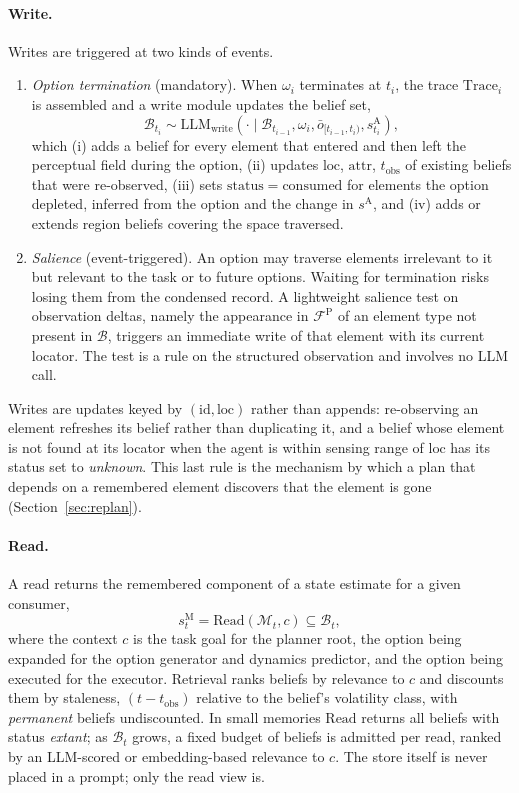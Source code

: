 \documentclass[11pt]{article}
\newcommand{\llm}[1]{\mathrm{LLM}_{\mathrm{#1}}}
\newcommand{\calF}{\mathcal{F}}
\newcommand{\calM}{\mathcal{M}}
\newcommand{\calB}{\mathcal{B}}
\newcommand{\sA}{s^{\mathrm{A}}}
\newcommand{\sM}{s^{\mathrm{M}}}
\newcommand{\FP}{\calF^{\mathrm{P}}}
\newcommand{\Read}{\mathrm{Read}}
\newcommand{\Trace}{\mathrm{Trace}}
\newcommand{\loc}{\mathrm{loc}}
\newcommand{\stat}{\mathrm{status}}
\newcommand{\attr}{\mathrm{attr}}
\newcommand{\id}{\mathrm{id}}
\begin{document}
\paragraph{Write.}
Writes are triggered at two kinds of events.
\begin{enumerate}[leftmargin=1.5em,itemsep=1pt]
\item \emph{Option termination} (mandatory). When $\omega_i$ terminates at $t_i$, the trace $\Trace_i$ is assembled and a write module updates the belief set,
\begin{equation}
\calB_{t_i}\sim\llm{write}(\cdot\mid\calB_{t_{i-1}},\omega_i,\bar o_{[t_{i-1},t_i)},\sA_{t_i}),
\label{eq:write}
\end{equation}
which (i) adds a belief for every element that entered and then left the perceptual field during the option, (ii) updates $\loc$, $\attr$, $t_{\mathrm{obs}}$ of existing beliefs that were re-observed, (iii) sets $\stat=\mathrm{consumed}$ for elements the option depleted, inferred from the option and the change in $\sA$, and (iv) adds or extends region beliefs covering the space traversed.
\item \emph{Salience} (event-triggered). An option may traverse elements irrelevant to it but relevant to the task or to future options. Waiting for termination risks losing them from the condensed record. A lightweight salience test on observation deltas, namely the appearance in $\FP$ of an element type not present in $\calB$, triggers an immediate write of that element with its current locator. The test is a rule on the structured observation and involves no LLM call.
\end{enumerate}
Writes are updates keyed by $(\id,\loc)$ rather than appends: re-observing an element refreshes its belief rather than duplicating it, and a belief whose element is not found at its locator when the agent is within sensing range of $\loc$ has its status set to \emph{unknown}. This last rule is the mechanism by which a plan that depends on a remembered element discovers that the element is gone (Section~\ref{sec:replan}).

\paragraph{Read.}
A read returns the remembered component of a state estimate for a given consumer,
\begin{equation}
\sM_t=\Read(\calM_t,c)\subseteq\calB_t,
\label{eq:read}
\end{equation}
where the context $c$ is the task goal for the planner root, the option being expanded for the option generator and dynamics predictor, and the option being executed for the executor. Retrieval ranks beliefs by relevance to $c$ and discounts them by staleness, $(t-t_{\mathrm{obs}})$ relative to the belief's volatility class, with \emph{permanent} beliefs undiscounted. In small memories $\Read$ returns all beliefs with status \emph{extant}; as $\calB_t$ grows, a fixed budget of beliefs is admitted per read, ranked by an LLM-scored or embedding-based relevance to $c$. The store itself is never placed in a prompt; only the read view is.
\end{document}
